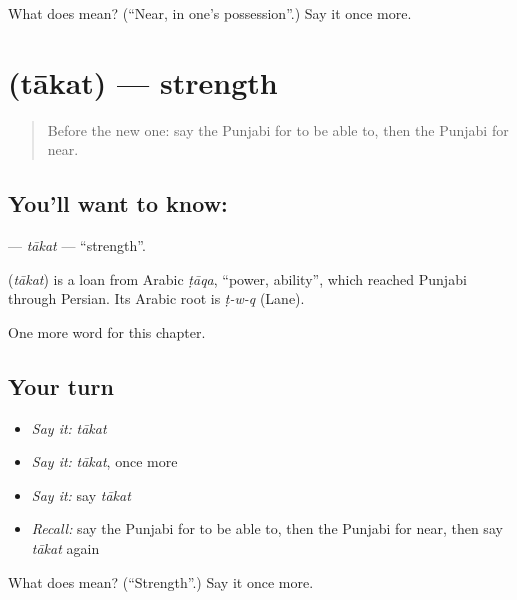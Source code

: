 \begin{tcolorbox}[breakable,colback=teal!4,colframe=teal!35!black,title={Before you move on}]
What does  mean? (\textquotedblleft{}Near, in one's possession\textquotedblright{}.) Say it once more.
\end{tcolorbox}
\section[\texorpdfstring{\pa{ਤਾਕਤ} (tākat)}{ਤਾਕਤ (tākat)}]{ (tākat) — strength}

\label{lesson:PA-C109-takat}



\begin{quote}
Before the new one: say the Punjabi for to be able to, then the Punjabi for near.
\end{quote}

\subsection*{You'll want to know: }
\textbf{} — \emph{tākat} — \textquotedblleft{}strength\textquotedblright{}.

\begin{cousinweb}
\textbf{} (\emph{tākat}) is a loan from Arabic \emph{ṭāqa}, \textquotedblleft{}power, ability\textquotedblright{}, which reached Punjabi through Persian. Its Arabic root is \emph{ṭ-w-q} (Lane).
\end{cousinweb}

\begin{grammarlens}[title={What you've built}]
One more word for this chapter.
\end{grammarlens}

\subsection*{Your turn}
\begin{itemize}
\raggedright
  \item \emph{Say it:} \emph{tākat}
  \item \emph{Say it:} \emph{tākat}, once more
  \item \emph{Say it:} say \emph{tākat}
  \item \emph{Recall:} say the Punjabi for to be able to, then the Punjabi for near, then say \emph{tākat} again
\end{itemize}

\begin{tcolorbox}[breakable,colback=teal!4,colframe=teal!35!black,title={Before you move on}]
What does  mean? (\textquotedblleft{}Strength\textquotedblright{}.) Say it once more.
\end{tcolorbox}
